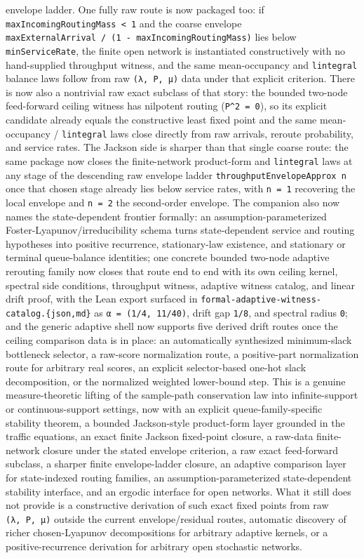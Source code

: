 \documentclass[
  11pt,
]{article}
\begin{document}
envelope ladder. One fully raw route is now packaged too: if
\texttt{maxIncomingRoutingMass\ \textless{}\ 1} and the coarse envelope
\texttt{maxExternalArrival\ /\allowbreak{}\ (1\ -\allowbreak{}\ maxIncomingRoutingMass)} lies
below \texttt{minServiceRate}, the finite open network is instantiated
constructively with no hand-supplied throughput witness, and the same
mean-occupancy and \texttt{lintegral} balance laws follow from raw
\texttt{(λ,\ P,\ μ)} data under that explicit criterion. There is now
also a nontrivial raw exact subclass of that story: the bounded two-node
feed-forward ceiling witness has nilpotent routing
(\texttt{P\^{}2\ =\ 0}), so its explicit candidate already equals the
constructive least fixed point and the same mean-occupancy /
\texttt{lintegral} laws close directly from raw arrivals, reroute
probability, and service rates. The Jackson side is sharper than that
single coarse route: the same package now closes the finite-network
product-form and \texttt{lintegral} laws at any stage of the descending
raw envelope ladder \texttt{throughputEnvelopeApprox\ n} once that
chosen stage already lies below service rates, with \texttt{n\ =\ 1}
recovering the local envelope and \texttt{n\ =\ 2} the second-order
envelope. The companion also now names the state-dependent frontier
formally: an assumption-parameterized Foster-Lyapunov/irreducibility
schema turns state-dependent service and routing hypotheses into
positive recurrence, stationary-law existence, and stationary or
terminal queue-balance identities; one concrete bounded two-node
adaptive rerouting family now closes that route end to end with its own
ceiling kernel, spectral side conditions, throughput witness, adaptive
witness catalog, and linear drift proof, with the Lean export surfaced
in \texttt{formal-\allowbreak{}adaptive-\allowbreak{}witness-\allowbreak{}catalog.\allowbreak{}\{json,md\}} as
\texttt{α\ =\ (1/4,\ 11/40)}, drift gap \texttt{1/8}, and spectral
radius \texttt{0}; and the generic adaptive shell now supports five
derived drift routes once the ceiling comparison data is in place: an
automatically synthesized minimum-slack bottleneck selector, a raw-score
normalization route, a positive-part normalization route for arbitrary
real scores, an explicit selector-based one-hot slack decomposition, or
the normalized weighted lower-bound step. This is a genuine
measure-theoretic lifting of the sample-path conservation law into
infinite-support or continuous-support settings, now with an explicit
queue-family-specific stability theorem, a bounded Jackson-style
product-form layer grounded in the traffic equations, an exact finite
Jackson fixed-point closure, a raw-data finite-network closure under the
stated envelope criterion, a raw exact feed-forward subclass, a sharper
finite envelope-ladder closure, an adaptive comparison layer for
state-indexed routing families, an assumption-parameterized
state-dependent stability interface, and an ergodic interface for open
networks. What it still does not provide is a constructive derivation of
such exact fixed points from raw \texttt{(λ,\ P,\ μ)} outside the
current envelope/residual routes, automatic discovery of richer
chosen-Lyapunov decompositions for arbitrary adaptive kernels, or a
positive-recurrence derivation for arbitrary open stochastic networks.
\end{document}
